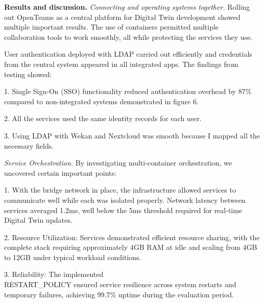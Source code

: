 \begin{multicols}{2}
{\bfseries Results and discussion.} \emph{Connecting and operating systems
together.} Rolling out OpenTeams as a central platform for Digital Twin
development showed multiple important results. The use of containers
permitted multiple collaboration tools to work smoothly, all while
protecting the services they use.

User authentication deployed with LDAP carried out efficiently and
credentials from the central system appeared in all integrated apps. The
findings from testing showed:

1. Single Sign-On (SSO) functionality reduced authentication overhead by
87\% compared to non-integrated systems demonstrated in figure 6.

2. All the services used the same identity records for each user.

3. Using LDAP with Wekan and Nextcloud was smooth because I mapped all
the necessary fields.

\emph{Service Orchestration.} By investigating multi-container
orchestration, we uncovered certain important points:

1. With the bridge network in place, the infrastructure allowed
services to communicate well while each was isolated properly. Network
latency between services averaged 1.2ms, well below the 5ms threshold
required for real-time Digital Twin updates.

2. Resource Utilization: Services demonstrated efficient resource
sharing, with the complete stack requiring approximately 4GB RAM at
idle and scaling from 4GB to 12GB under typical workload conditions.

3. Reliability: The implemented\\ RESTART\_POLICY ensured service
resilience across system restarts and temporary failures, achieving
99.7\% uptime during the evaluation period.
\end{multicols}



